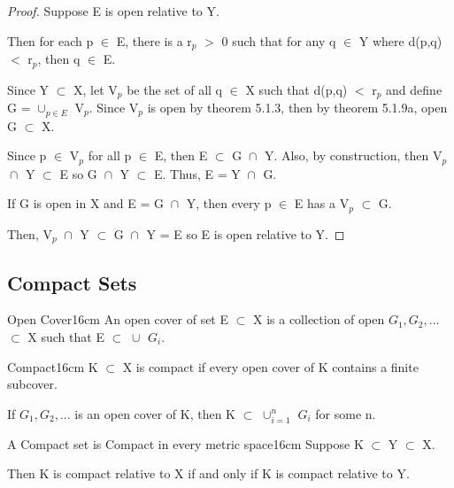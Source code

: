 	\begin{proof}
		Suppose E is open relative to Y.

		Then for each p $\in$ E, there is a r$_p$ $>$ 0 such that for
		any q $\in$ Y where d(p,q) $<$ r$_p$, then q $\in$ E.
		
		Since Y $\subset$ X, let V$_p$ be the set of all q $\in$ X
		such that d(p,q) $<$ r$_p$ and define G = $\cup_{p \in E}^{}$ V$_p$.
		Since V$_p$ is open by {\color{red} theorem 5.1.3}, then by
		{\color{red} theorem 5.1.9a}, open G $\subset$ X.

		Since p $\in$ V$_p$ for all p $\in$ E, then E $\subset$ G $\cap_{}^{}$ Y.
		Also, by construction, then V$_p$ $\cap_{}^{}$ Y $\subset$ E so
		G $\cap_{}^{}$ Y $\subset$ E.
		Thus, E = Y $\cap_{}^{}$ G.

		If G is open in X and E = G $\cap_{}^{}$ Y, then every p $\in$ E has
		a V$_p$ $\subset$ G.

		Then, V$_p$ $\cap_{}^{}$ Y $\subset$ G $\cap_{}^{}$ Y = E so
		E is open relative to Y.
	\end{proof}

	\vspace{0.3cm}

	



\subsection{ Compact Sets }

	\begin{definition}{Open Cover}{16cm}
		An {\color{lblue} open cover} of set E $\subset$ X is a collection of
		open $G_1, G_2, ...$ $\subset$ X
		such that E $\subset$ $\cup_{}^{}$ $G_i$.
	\end{definition}
	
	\vspace{0.5cm}



	\begin{definition}{Compact}{16cm}
		K $\subset$ X is {\color{lblue} compact} if every open cover
		of K contains a finite subcover.

		\qquad If $G_1, G_2, ...$ is an open cover of K, then
		K $\subset$ $\cup_{i=1}^{n}$ $G_i$ for some n.
	\end{definition}
	
	\vspace{0.5cm}



	\begin{wtheorem}{A Compact set is Compact in every metric space}{16cm}
		Suppose K $\subset$ Y $\subset$ X.

		Then K is compact relative to X if and only if K is
		compact relative to Y.
	\end{wtheorem}
	
